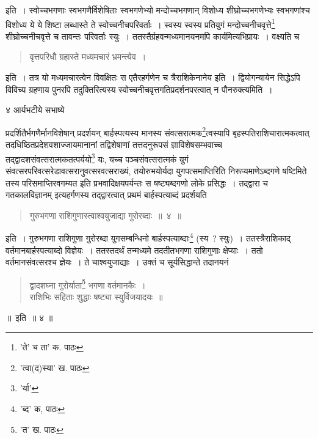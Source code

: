 \documentclass[11pt, openany]{book}
\begin{document}
\noindent इति~। स्वोच्चभगणाः स्वभगणैर्विशेषिताः स्वभगणेभ्यो मन्दोच्चभगणान् विशोध्य शीघ्रोच्चभगणेभ्यः स्वभगणांश्च विशोध्य ये ये शिष्टा लब्धास्ते ते स्वोच्चनीचपरिवर्ताः~। स्वस्य स्वस्य प्रतियुगं मन्दोच्चनीचवृत्ते\renewcommand{\thefootnote}{३}\footnote{'ते' च ता' क. पाठः} शीघ्रोच्चनीचवृत्ते च तावन्तः परिवर्ताः स्युः~। ततस्तैर्ग्रहवन्मध्यमानयनमपि
कार्यमित्यभिप्रायः~। वक्ष्यति च\textendash 

\begin{quote}
{\qt वृत्तपरिधौ ग्रहास्ते मध्यमचारं भ्रमन्त्येव~।}
\end{quote} 

\noindent इति~। तत्र यो मध्यमचारत्वेन विवक्षितः स एतैरहर्गणेन च त्रैराशिकेनानेय इति~। द्वियोगन्यायेन सिद्धेऽपि विविच्य ग्रहणाय पुनरपि तदुक्तिरित्यस्य स्वोच्चनीचवृत्तगतिप्रदर्शनपरत्वात् न पौनरुक्त्यमिति~।

\newpage

\vspace{3cm}४ \hspace{4cm} आर्यभटीये सभाष्ये

\vspace{0.3cm}
\begin{sloppypar} 
प्रदर्शितैर्भगणैर्मानविशेषान् प्रदर्शयन् बार्हस्पत्यस्य मानस्य
संवत्सरात्मक\renewcommand{\thefootnote}{१}\footnote{'त्वा(द)स्या' ख. पाठः}त्वस्यापि 
बृहस्पतिराशिचारात्मकत्वात् तदधिष्ठितप्रदेशवशाज्जायमानानां तद्विशेषाणां तत्तदनुरूपसं ज्ञाविशेषसम्भवाच्च तद्द्वादशसंवत्सरात्मकतत्पर्ययो\renewcommand{\thefootnote}{२}\footnote{'र्या'} यः, यच्च
पञ्चसंवत्सरात्मकं युगं संवत्सरपरिवत्सरेडावत्सरानुवत्सरवत्सराख्यं, तयोरुभयोर्यदा युगपत्समाप्तिरिति
निरूप्यमाणेऽब्दगणे षष्टिमिते तस्य परिसमाप्तिरवगम्यत इति प्रभवादिक्षयपर्यन्तः स षष्ट्यब्दगणो लोके प्रसिद्धः~। तद्द्वारा च गतकालविज्ञानम् इत्यहर्गणस्य तद्द्वारत्वात् प्रथमं बार्हस्पत्याब्दं प्रदर्शयति\textendash
\end{sloppypar} 

\begin{quote}
{\ab गुरुभगणा राशिगुणास्त्वाश्वयुजाद्या गुरोरब्दाः~॥~४~॥}
\end{quote}


इति~। गुरुभगणा राशिगुणा गुरोरब्दा युगसम्बन्धिनो बार्हस्पत्याब्दाः\renewcommand{\thefootnote}{३}\footnote{'ब्द' क, पाठः} (स्य~? स्युः)~। ततस्त्रैराशिकाद् वर्तमानबार्हस्पत्याब्दो विज्ञेयः~।
ततस्तदर्थं तन्मध्यमे तदतीतभगणा राशिगुणाः क्षेप्याः~। ततो वर्तमानसंवत्सरश्च ज्ञेयः~। ते चाश्वयुजाद्याः~। उक्तं च सूर्यसिद्धान्ते तदानयनं\textendash

\begin{quote}
{\qt द्वादशघ्ना गुरोर्याता\renewcommand{\thefootnote}{४}\footnote{'त' ख. पाठः} भगणा वर्तमानकैः~।\\
राशिभिः सहिताः शुद्धाः षष्ट्या स्युर्विजयादयः~॥}
\end{quote}
 ॥~इति~॥ ४ ॥\\
\end{document}
